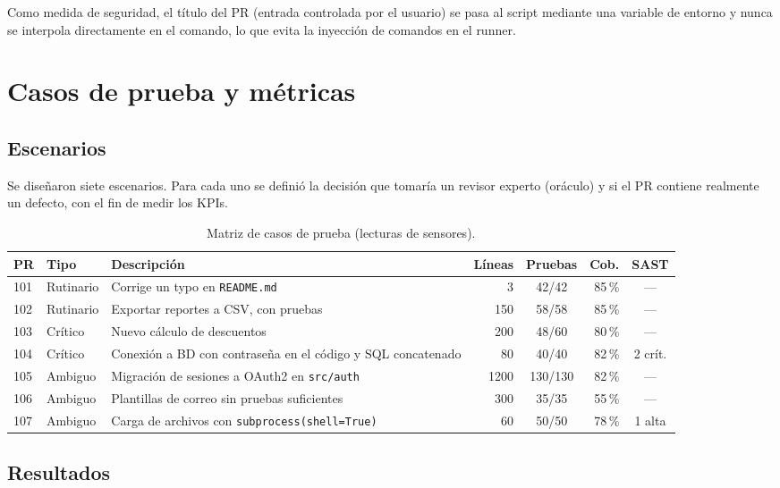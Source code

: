 \documentclass[11pt,a4paper]{article}
\begin{document}
\noindent Como medida de seguridad, el título del PR (entrada controlada por el usuario) se pasa al
script mediante una variable de entorno y nunca se interpola directamente en el comando, lo que evita
la inyección de comandos en el runner.

\section{Casos de prueba y métricas}

\subsection{Escenarios}

Se diseñaron siete escenarios. Para cada uno se definió la decisión que tomaría un revisor experto
(oráculo) y si el PR contiene realmente un defecto, con el fin de medir los KPIs.

\begin{table}[H]
\centering
\caption{Matriz de casos de prueba (lecturas de sensores).}
\label{tab:casos}
\small
\begin{tabularx}{\textwidth}{@{}l l >{\raggedright\arraybackslash}X r c r c@{}}
\toprule
\textbf{PR} & \textbf{Tipo} & \textbf{Descripción} & \textbf{Líneas} & \textbf{Pruebas} & \textbf{Cob.} & \textbf{SAST} \\
\midrule
101 & Rutinario & Corrige un typo en \texttt{README.md} & 3 & 42/42 & 85\,\% & --- \\
102 & Rutinario & Exportar reportes a CSV, con pruebas & 150 & 58/58 & 85\,\% & --- \\
103 & Crítico & Nuevo cálculo de descuentos & 200 & 48/60 & 80\,\% & --- \\
104 & Crítico & Conexión a BD con contraseña en el código y SQL concatenado & 80 & 40/40 & 82\,\% & 2 crít. \\
105 & Ambiguo & Migración de sesiones a OAuth2 en \texttt{src/auth} & 1200 & 130/130 & 82\,\% & --- \\
106 & Ambiguo & Plantillas de correo sin pruebas suficientes & 300 & 35/35 & 55\,\% & --- \\
107 & Ambiguo & Carga de archivos con \texttt{subprocess(shell=True)} & 60 & 50/50 & 78\,\% & 1 alta \\
\bottomrule
\end{tabularx}
\end{table}

\subsection{Resultados}
\end{document}
